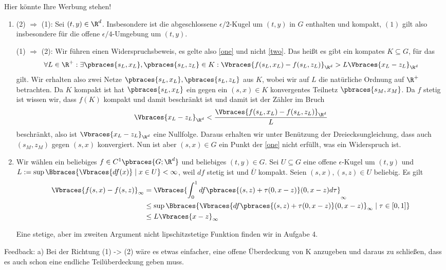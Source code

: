 \begin{solution}
  Hier könnte Ihre Werbung stehen!

  \begin{enumerate}[label = \alph*)]
    \item
    (2) $\Rightarrow$ (1): Sei $(t, y) \in \R^d$.
    Insbesondere ist die abgeschlossene $\epsilon /2$-Kugel um $(t,y)$ in $G$ enthalten und kompakt, $(1)$ gilt also insbesondere für die offene $\epsilon /4$-Umgebung um $(t,y)$.

    (1) $\Rightarrow$ (2):
    Wir führen einen Widerspruchsbeweis, es gelte also \ref{one} und nicht \ref{two}. Das heißt es gibt ein kompates $K \subseteq G$, für das
    \begin{align*}
      \forall L \in \R^+: \exists \pbraces{s_L,x_L}, \pbraces{s_L, z_L} \in K: \Vbraces{f(s_L,x_L) - f(s_L,z_L)}_{\R^d} > L \Vbraces{x_L - z_L}_{\R^d}
    \end{align*}
    gilt. Wir erhalten also zwei Netze $\pbraces{s_L,x_L}, \pbraces{s_L, z_L}$ aus $K$, wobei wir auf $L$ die natürliche Ordnung auf $\R^+$ betrachten. Da $K$ kompakt ist hat $\pbraces{s_L,x_L}$ ein gegen ein $(s,x) \in K$ konvergentes Teilnetz $\pbraces{s_M, x_M}$. Da $f$ stetig ist wissen wir, dass $f(K)$ kompakt und damit beschränkt ist und damit ist der Zähler im Bruch
    \begin{align*}
      \Vbraces{x_L - z_L}_{\R^d} < \frac{\Vbraces{f(s_L,x_L) - f(s_L,z_L)}_{\R^d}}{L}
    \end{align*}
    beschränkt, also ist $\Vbraces{x_L - z_L}_{\R^d}$ eine Nullfolge. Daraus erhalten wir unter Benützung der Dreiecksungleichung, dass auch $(s_M,z_M)$ gegen $(s,x)$ konvergiert. Nun ist aber $(s,x) \in G$ ein Punkt der \ref{one} nicht erfüllt, was ein Widerspruch ist.

    \item Wir wählen ein beliebiges $f \in C^1\pbraces{G; \R^d}$ und beliebiges $(t,y) \in G$. Sei $U \subseteq G$ eine offene $\epsilon$-Kugel um $(t,y)$ und $L := \sup\Bbraces{\Vbraces{df(x)} \mid x \in U } < \infty$, weil $df$ stetig ist und $\overline{U}$ kompakt. Seien $(s,x), (s,z) \in U$ beliebig. Es gilt
    \begin{align*}
      \Vbraces{f(s,x) - f(s,z)}_\infty &= \Vbraces{\int_0^1 df\pbraces{(s,z) + \tau (0, x - z)} (0, x - z) d\tau }_\infty \\
      &\leq \sup\Bbraces{ \Vbraces{df\pbraces{(s,z) + \tau (0, x - z)} (0, x - z)}_\infty \mid \tau \in [0,1] } \\
      &\leq L \Vbraces{x - z}_\infty
    \end{align*}

    Eine stetige, aber im zweiten Argument nicht lipschitzstetige Funktion finden wir in Aufgabe 4.
  \end{enumerate}

Feedback:
a) Bei der Richtung (1) -> (2) wäre es etwas einfacher, eine offene Überdeckung von K anzugeben und daraus zu schließen, dass es auch schon eine endliche Teilüberdeckung geben muss.

\end{solution}
